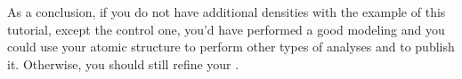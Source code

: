 \begin{itemize}
   As a conclusion, if you do not have additional densities with the example of this tutorial, except the control one, you'd have performed a good modeling and you could use your atomic structure to perform other types of analyses and to publish it. Otherwise, you should still refine your .
 
\end{itemize}
